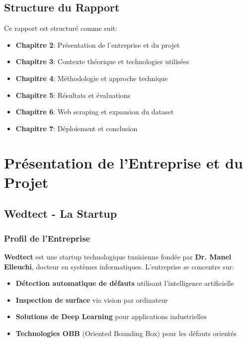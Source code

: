 \documentclass[a4paper,12pt]{report}
\begin{document}
\section{Structure du Rapport}

Ce rapport est structuré comme suit:
\begin{itemize}
    \item \textbf{Chapitre 2}: Présentation de l'entreprise et du projet
    \item \textbf{Chapitre 3}: Contexte théorique et technologies utilisées
    \item \textbf{Chapitre 4}: Méthodologie et approche technique
    \item \textbf{Chapitre 5}: Résultats et évaluations
    \item \textbf{Chapitre 6}: Web scraping et expansion du dataset
    \item \textbf{Chapitre 7}: Déploiement et conclusion
\end{itemize}

\chapter{Présentation de l'Entreprise et du Projet}

\section{Wedtect - La Startup}

\subsection{Profil de l'Entreprise}

\textbf{Wedtect} est une startup technologique tunisienne fondée par \textbf{Dr. Manel Elleuchi}, docteur en systèmes informatiques. L'entreprise se concentre sur:

\begin{itemize}
    \item \textbf{Détection automatique de défauts} utilisant l'intelligence artificielle
    \item \textbf{Inspection de surface} via vision par ordinateur
    \item \textbf{Solutions de Deep Learning} pour applications industrielles
    \item \textbf{Technologies OBB} (Oriented Bounding Box) pour les défauts orientés
\end{itemize}
\end{document}
